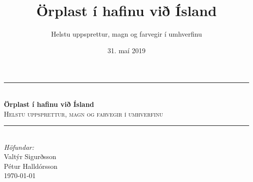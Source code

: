 \documentclass[icelandic,]{book}
\title{{Örplast í hafinu við Ísland}}
\subtitle{{ Helstu uppsprettur, magn og farvegir í umhverfinu}}
\author{}
\date{31. maí 2019}
\begin{document}
\begin{titlepage}
\newcommand{\HRule}{\rule{\linewidth}{0.5mm}} %

\center %
 



\HRule \\[0.4cm]
{ \huge \bfseries Örplast í hafinu við Ísland}\\[0.4cm] %
\textsc{\Large Helstu uppsprettur, magn og farvegir í umhverfinu}\\[0.5cm] 
\HRule \\[1.5cm]
 



\Large \emph{Höfundar:}\\[.3cm] %
Valtýr Sigurðsson\\[.2cm] %
Pétur Halldórsson\\[2cm] 

{\large \today}\\[2cm] %


\end{titlepage}
\end{document}

